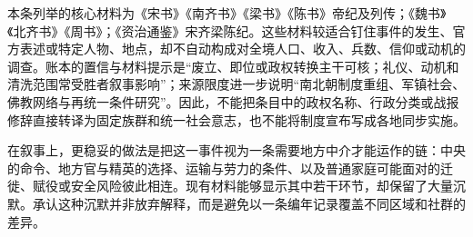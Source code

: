 本条列举的核心材料为《宋书》《南齐书》《梁书》《陈书》帝纪及列传；《魏书》《北齐书》《周书》；《资治通鉴》宋齐梁陈纪。这些材料较适合钉住事件的发生、官方表述或特定人物、地点，却不自动构成对全境人口、收入、兵数、信仰或动机的调查。账本的置信与材料提示是“废立、即位或政权转换主干可核；礼仪、动机和清洗范围常受胜者叙事影响”；来源限度进一步说明“南北朝制度重组、军镇社会、佛教网络与再统一条件研究”。因此，不能把条目中的政权名称、行政分类或战报修辞直接转译为固定族群和统一社会意志，也不能将制度宣布写成各地同步实施。

在叙事上，更稳妥的做法是把这一事件视为一条需要地方中介才能运作的链：中央的命令、地方官与精英的选择、运输与劳力的条件、以及普通家庭可能面对的迁徙、赋役或安全风险彼此相连。现有材料能够显示其中若干环节，却保留了大量沉默。承认这种沉默并非放弃解释，而是避免以一条编年记录覆盖不同区域和社群的差异。
